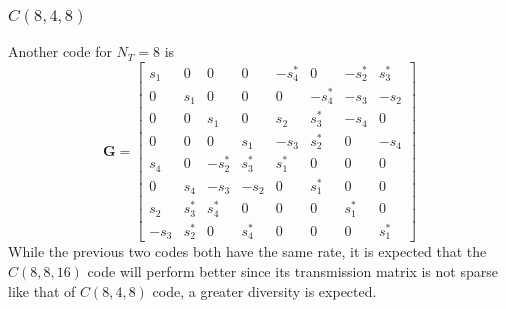 \subsubsection{$C(8,4,8)$}
Another code for $N_T=8$ is~\cite{larsson03}
\[ \bm{G} = \begin{bmatrix}
  s_1 & 0 & 0 & 0 & -s_4^\ast & 0 & -s_2^\ast & s_3^\ast \\
  0 & s_1 & 0 & 0 & 0 & -s_4^\ast & -s_3 & -s_2 \\
  0 & 0 & s_1 & 0 & s_2 & s_3^\ast & -s_4 & 0 \\
  0 & 0 & 0 & s_1 & -s_3 & s_2^\ast & 0 & -s_4 \\
  s_4 & 0 & -s_2^\ast & s_3^\ast & s_1^\ast & 0 & 0 & 0 \\
  0 & s_4 & -s_3 & -s_2 & 0 & s_1^\ast & 0 & 0 \\
  s_2 & s_3^\ast & s_4^\ast & 0 & 0 & 0 &s_1^\ast & 0 \\
  -s_3 & s_2^\ast & 0 & s_4^\ast & 0 & 0 & 0 & s_1^\ast
\end{bmatrix} \]
While the previous two codes both have the same rate, it is expected that the $C(8,8,16)$ code will perform better since its transmission matrix is not sparse like that of $C(8,4,8)$ code, a greater diversity is expected.
